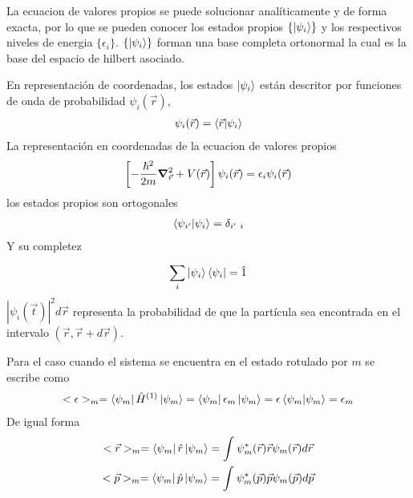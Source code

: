 \documentclass{article}
\begin{document}
La ecuacion de valores propios se puede solucionar analíticamente y de forma exacta, por lo que se pueden conocer los estados propios $ \{\ket{\psi_i }\} $ y los respectivos niveles de energia $ \{\epsilon_i \} $. $ \{\ket{\psi_i }\} $ forman una base completa ortonormal la cual es la base del espacio de hilbert asociado. 

En representación de coordenadas, los estados $ \ket{\psi _i }  $ están descritor por funciones de onda de probabilidad $ \psi_i (\vec r ) $, 
\begin{gather*}
  \psi_i (\vec r ) = \bra{\vec r }\ket{\psi_i }  
\end{gather*}
La representación en coordenadas de la ecuacion de valores propios 
\begin{gather*}
  \left[- \frac{\hbar ^2}{2m }\grad^2 _{\vec r } + V (\vec r )\right]\psi_i (\vec r ) = \epsilon_i \psi_i (\vec r ) 
\end{gather*}
los estados propios son ortogonales 
\begin{gather*}
  \bra{\psi _{i' } }\ket{\psi_i } = \delta _{i'\ i }   
\end{gather*}
Y su completez 
\begin{gather*}
  \displaystyle\sum_{i }^{} \ket{\psi_i }\bra{\psi_i } = \hat 1  
\end{gather*}
$ \left|\psi_i (\vec t )\right|^2 d\vec r  $ representa la probabilidad de que la partícula sea encontrada en el intervalo $ (\vec r, \vec r + d \vec r ) $.

Para el caso cuando el sistema se encuentra en el estado rotulado por $ m  $ se escribe como 
\begin{gather*}
  <\epsilon>_m = \bra{\psi_m } \hat H ^ {(1) }\ket{\psi_m } = \bra{\psi_m } \epsilon_m \ket{\psi_m } = \epsilon \bra{\psi_m }\ket{\psi_m } = \epsilon_m     
\end{gather*}
De igual forma 
\begin{gather*}
  <\vec r >_m  = \bra{\psi_m }\hat r \ket{\psi_m } = \int_{}^{} \psi_m^* (\vec r ) \vec r \psi_m (\vec r ) d\vec r\\   
  <\vec p >_m  = \bra{\psi_m }\hat p \ket{\psi_m } = \int_{}^{} \psi_m^* (\vec p ) \vec p \psi_m (\vec p ) d\vec p   
\end{gather*}

\hfill 

\hfill 

\hfill 
\end{document}
